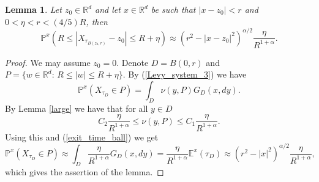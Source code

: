\documentclass[a4paper,12pt,reqno]{amsart}
\newtheorem{lemma}[theorem]{Lemma}
\theoremstyle{definition}
\theoremstyle{remark}
\newcommand{\Ee}{\mathds{E}} %
\newcommand{\Pp}{\mathds{P}} %
\newcommand{\Rd}{\mathds{R}^d}
\begin{document}
\begin{lemma}\label{I-W} Let $z_0\in \Rd$ and let $x\in \Rd$ be such that $|x-z_0|< r$ and $0<\eta<r<(4/5)R$, then
$$\Pp^x(R\le|X_{\tau_{B(z_0,r)}}-z_0|\le R+\eta)\approx (r^2-|x-z_0|^2)^{\alpha/2}\frac \eta{R^{1+\alpha}}.$$ 
\end{lemma}
\begin{proof} We may assume $z_0 = 0$. Denote $D= B(0,r)$ and $P= \{w\in \Rd: \, R\le |w|\le R+\eta\}.$ By (\ref{Levy_system_3})
we have 
$$\Pp^x(X_{\tau_{D}}\in P)=\int_D \nu(y,P) G_D(x, dy).$$
By  Lemma \ref{large} we have that for all $y\in D$
$$C_2\frac \eta{R^{1+\alpha}}\le \nu(y,P)\le C_1 \frac \eta{R^{1+\alpha}}.$$
Using this and  (\ref{exit_time_ball}) we get
$$
\Pp^x(X_{\tau_{D}}\in P)\approx \int_ D \frac \eta{R^{1+\alpha}} G_D(x, dy) 
= \frac \eta{R^{1+\alpha}} \Ee^x(\tau_D) 
\approx (r^2-|x|^2)^{\alpha/2} \frac \eta{R^{1+\alpha}},
$$
which gives the assertion of the lemma.
\end{proof}
\end{document}

